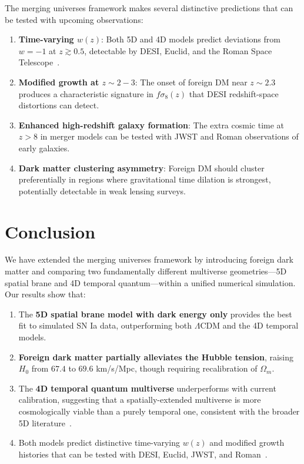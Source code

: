 \documentclass[12pt]{article}
\begin{document}
The merging universes framework makes several distinctive predictions that can be tested with upcoming observations:

\begin{enumerate}
    \item \textbf{Time-varying $w(z)$}: Both 5D and 4D models predict deviations from $w=-1$ at $z \gtrsim 0.5$, detectable by DESI, Euclid, and the Roman Space Telescope~\cite{pang2025}.
    \item \textbf{Modified growth at $z \sim 2-3$}: The onset of foreign DM near $z \sim 2.3$ produces a characteristic signature in $f\sigma_8(z)$ that DESI redshift-space distortions can detect.
    \item \textbf{Enhanced high-redshift galaxy formation}: The extra cosmic time at $z > 8$ in merger models can be tested with JWST and Roman observations of early galaxies.
    \item \textbf{Dark matter clustering asymmetry}: Foreign DM should cluster preferentially in regions where gravitational time dilation is strongest, potentially detectable in weak lensing surveys.
\end{enumerate}

\section{Conclusion}

We have extended the merging universes framework by introducing foreign dark matter and comparing two fundamentally different multiverse geometries---5D spatial brane and 4D temporal quantum---within a unified numerical simulation. Our results show that:

\begin{enumerate}
    \item The \textbf{5D spatial brane model with dark energy only} provides the best fit to simulated SN Ia data, outperforming both $\Lambda$CDM and the 4D temporal models.
    \item \textbf{Foreign dark matter partially alleviates the Hubble tension}, raising $H_0$ from $67.4$ to $69.6$ km/s/Mpc, though requiring recalibration of $\Omega_m$.
    \item The \textbf{4D temporal quantum multiverse} underperforms with current calibration, suggesting that a spatially-extended multiverse is more cosmologically viable than a purely temporal one, consistent with the broader 5D literature~\cite{panigrahi2007, ramirez2025, masarrat2025, silva2024}.
    \item Both models predict distinctive time-varying $w(z)$ and modified growth histories that can be tested with DESI, Euclid, JWST, and Roman~\cite{pang2025, kamionkowski2023}.
\end{enumerate}
\end{document}

